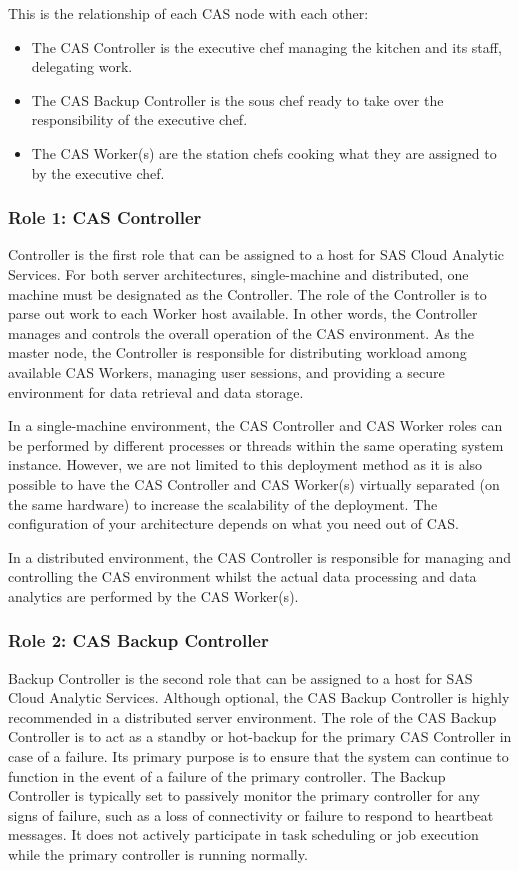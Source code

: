 This is the relationship of each CAS node with each other:
\begin{itemize}
    \item The CAS Controller is the executive chef managing the kitchen and its staff, delegating work.
    \item The CAS Backup Controller is the sous chef ready to take over the responsibility of the executive chef. 
    \item The CAS Worker(s) are the station chefs cooking what they are assigned to by the executive chef. 
\end{itemize}

\subsubsection{Role 1: CAS Controller}
Controller is the first role that can be assigned to a host for SAS Cloud Analytic Services. For both server architectures, single-machine and distributed, one machine must be designated as the Controller. The role of the Controller is to parse out work to each Worker host available. In other words, the Controller manages and controls the overall operation of the CAS environment. As the master node, the Controller is responsible for distributing workload among available CAS Workers, managing user sessions, and providing a secure environment for data retrieval and data storage. 

In a single-machine environment, the CAS Controller and CAS Worker roles can be performed by different processes or threads within the same operating system instance. However, we are not limited to this deployment method as it is also possible to have the CAS Controller and CAS Worker(s) virtually separated (on the same hardware) to increase the scalability of the deployment. The configuration of your architecture depends on what you need out of CAS.  

In a distributed environment, the CAS Controller is responsible for managing and controlling the CAS environment whilst the actual data processing and data analytics are performed by the CAS Worker(s).

\subsubsection{Role 2: CAS Backup Controller}
Backup Controller is the second role that can be assigned to a host for SAS Cloud Analytic Services. Although optional, the CAS Backup Controller is highly recommended in a distributed server environment. The role of the CAS Backup Controller is to act as a standby or hot-backup for the primary CAS Controller in case of a failure. Its primary purpose is to ensure that the system can continue to function in the event of a failure of the primary controller. The Backup Controller is typically set to passively monitor the primary controller for any signs of failure, such as a loss of connectivity or failure to respond to heartbeat messages. It does not actively participate in task scheduling or job execution while the primary controller is running normally. 

